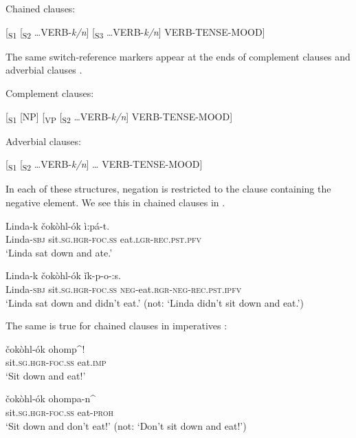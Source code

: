 \documentclass[output=paper,colorlinks,citecolor=brown]{langscibook}
\begin{document}
\ea\label{ex:koa:51}
    Chained clauses:
    
    [\textsubscript{S1} [\textsubscript{S2} …VERB-\textit{k/n}] [\textsubscript{S3} …VERB-\textit{k/n}] VERB-TENSE-MOOD]
\z 

The same switch-reference markers appear at the ends of complement clauses  and adverbial clauses .

\ea\label{ex:koa:52}
    Complement clauses:
    
    [\textsubscript{S1} [NP] [\textsubscript{VP} [\textsubscript{S2} …VERB-\textit{k/n}] VERB-TENSE-MOOD]
\z 

\ea\label{ex:koa:53}
    Adverbial clauses:
    
    [\textsubscript{S1} [\textsubscript{S2} …VERB-\textit{k/n}] … VERB-TENSE-MOOD] 
\z 

In each of these structures, negation is restricted to the clause containing the negative element. We see this in chained clauses in .

\ea\label{ex:koa:54}
    \ea\label{ex:koa:54a}
        \gll Linda-k  čokòhl-ók  ì:pá-t. \\ 
             Linda-\textsc{sbj}  sit.\textsc{sg}.\textsc{hgr-foc}.\textsc{ss}  eat.\textsc{lgr}-\textsc{rec.pst.pfv} \\
        \glt ‘Linda sat down and ate.’
    
    \ex\label{ex:koa:54b}
        \gll Linda-k  čokòhl-ók ǐk-p-o-:s.\\ 
             Linda-\textsc{sbj}  sit.\textsc{sg}.\textsc{hgr-foc}.\textsc{ss} \textsc{neg}-eat.\textsc{rgr}-\textsc{neg}-\textsc{rec.pst}.\textsc{ipfv}\\
        \glt ‘Linda sat down and didn’t eat.’ (not: ‘Linda didn’t sit down     and eat.’)
    \z
\z 

The same is true for chained clauses in imperatives :

\ea\label{ex:koa:55}
    \ea\label{ex:koa:55a}
        \gll čokòhl-ók  ohomp\^{}! \\ 
             sit.\textsc{sg}.\textsc{hgr}-\textsc{foc}.\textsc{ss}  eat.\textsc{imp} \\
        \glt ‘Sit down and eat!’
    
    \ex\label{ex:koa:55b}
        \gll čokòhl-ók  ohompa-n\^{} \\
             sit.\textsc{sg}.\textsc{hgr}-\textsc{foc}.\textsc{ss}  eat-\textsc{proh} \\
        \glt ‘Sit down and don’t eat!’ (not: ‘Don’t sit down and eat!’)
    \z
\z 
\end{document}
